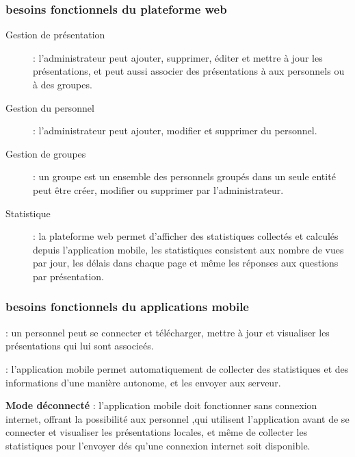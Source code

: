 \documentclass[12pt, ChapStyle1, oneside]{./Styles/Dea_Gsm}
\begin{document}
\subsubsection{besoins fonctionnels du plateforme web}
\begin{description}
\item [Gestion de présentation ]: l'administrateur peut ajouter, supprimer, éditer et mettre à jour les présentations, et peut aussi associer des présentations à aux personnels ou à des groupes.

\item [Gestion du personnel] : l'administrateur peut ajouter, modifier et supprimer du personnel.

\item [Gestion de groupes] : un groupe est un ensemble des personnels groupés dans un seule entité peut être créer, modifier ou supprimer par l'administrateur.

\item [Statistique] : la plateforme web permet d’afficher des statistiques collectés et calculés depuis l’application mobile, les statistiques consistent aux nombre de vues par jour, les délais dans chaque page et même les réponses aux questions par présentation.
\end{description}
\subsubsection{besoins fonctionnels du applications mobile}

\begin{description}
\item [Visualisation des présentations] : un personnel peut se connecter et télécharger, mettre à jour et visualiser les présentations qui lui sont associeés.

\item [Statistique] : l’application mobile permet automatiquement de collecter des statistiques et des informations d’une manière autonome, et les envoyer aux serveur.

\item \textbf{Mode déconnecté} : l’application mobile doit fonctionner sans connexion internet, offrant la possibilité aux personnel ,qui utilisent l’application avant de se connecter et visualiser les présentations locales, et même de collecter les statistiques pour l’envoyer dés qu'une connexion internet soit disponible.
\end{description}
\end{document}
